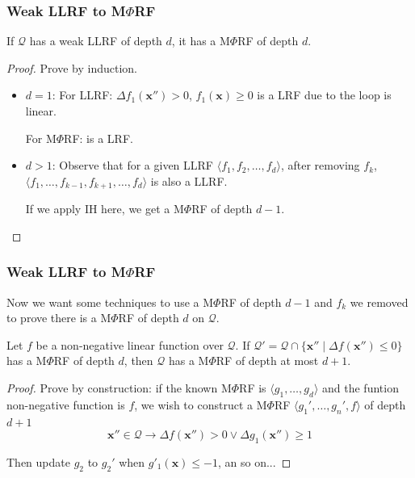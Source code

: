 \documentclass[11pt]{beamer}
\begin{document}
\begin{frame}\frametitle{Weak LLRF to M$\Phi$RF}

\begin{theorem}[3]
If $\mathcal{Q}$ has a weak LLRF of depth $d$, it has a  M$\Phi$RF of depth $d$.


\end{theorem}

\begin{proof}
Prove by induction.

\begin{itemize}

\item $d = 1$: 
For LLRF: $\Delta f_1(\textbf{x}'') > 0$, $f_1(\textbf{x}) \ge 0$ is a LRF due to the loop is linear.

For M$\Phi$RF: is a LRF.

\item $d > 1$: Observe that for a given LLRF $\langle f_1, f_2, \ldots, f_d\rangle $, after removing $f_k$, $\langle f_1, \ldots, f_{k-1}, f_{k+1}, \ldots, f_d\rangle$ is also a LLRF.

If we apply IH here, we get a M$\Phi$RF of depth $d-1$.

\end{itemize}


\end{proof}


\end{frame}


\begin{frame}\frametitle{Weak LLRF to M$\Phi$RF}
Now we want some techniques to use a M$\Phi$RF of depth $d - 1$ and $f_k$ we removed to prove there is a M$\Phi$RF of depth $d$ on $\mathcal{Q}$. 
\begin{lemma}[2]
Let $f$ be a non-negative linear function over $\mathcal{Q}$. If $\mathcal{Q}' = \mathcal{Q}\cap \{\textbf{x} '' \mid \Delta f(\textbf{x} '') \le 0\}$ has a M$\Phi$RF of depth $d$, then $\mathcal{Q}$ has a M$\Phi$RF of depth at most $d + 1$.
\end{lemma}
\begin{proof}
Prove by construction: if the known M$\Phi$RF is $\langle g_1, \ldots, g_d \rangle$ and the funtion non-negative function is $f$, we wish to construct a  M$\Phi$RF $\langle g_1', \ldots, g_n', f\rangle$ of depth $d + 1$
\[\textbf{x}''\in \mathcal{Q} \rightarrow \Delta f(\textbf{x}'') > 0 \vee \Delta g_1(\textbf{x}'') \ge 1\]

Then update $g_2$ to $g_2'$ when $g'_1(\textbf{x}) \le -1$, an so on...

\end{proof}

\end{frame}
\end{document}
